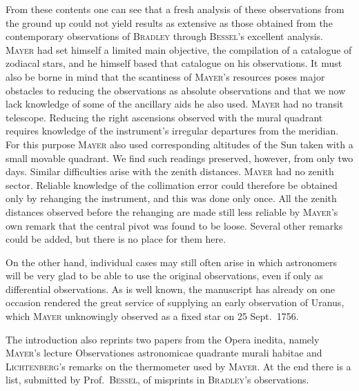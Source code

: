 From these contents one can see that a fresh analysis of these observations from the ground up could not yield results as extensive as those obtained from the contemporary observations of \textsc{Bradley} through \textsc{Bessel}'s excellent analysis. \textsc{Mayer} had set himself a limited main objective, the compilation of a catalogue of zodiacal stars, and he himself based that catalogue on his observations. It must also be borne in mind that the scantiness of \textsc{Mayer}'s resources poses major obstacles to reducing the observations as absolute observations and that we now lack knowledge of some of the ancillary aids he also used. \textsc{Mayer} had no transit telescope. Reducing the right ascensions observed with the mural quadrant requires knowledge of the instrument's irregular departures from the meridian. For this purpose \textsc{Mayer} also used corresponding altitudes of the Sun taken with a small movable quadrant. We find such readings preserved, however, from only two days. Similar difficulties arise with the zenith distances. \textsc{Mayer} had no zenith sector. Reliable knowledge of the collimation error could therefore be obtained only by rehanging the instrument, and this was done only once. All the zenith distances observed before the rehanging are made still less reliable by \textsc{Mayer}'s own remark that the central pivot was found to be loose. Several other remarks could be added, but there is no place for them here.

On the other hand, individual cases may still often arise in which astronomers will be very glad to be able to use the original observations, even if only as differential observations. As is well known, the manuscript has already on one occasion rendered the great service of supplying an early observation of Uranus, which \textsc{Mayer} unknowingly observed as a fixed star on 25 Sept.~1756.

The introduction also reprints two papers from the Opera inedita, namely \textsc{Mayer}'s lecture Observationes astronomicae quadrante murali habitae and \textsc{Lichtenberg}'s remarks on the thermometer used by \textsc{Mayer}. At the end there is a list, submitted by Prof.~\textsc{Bessel}, of misprints in \textsc{Bradley}'s observations.
